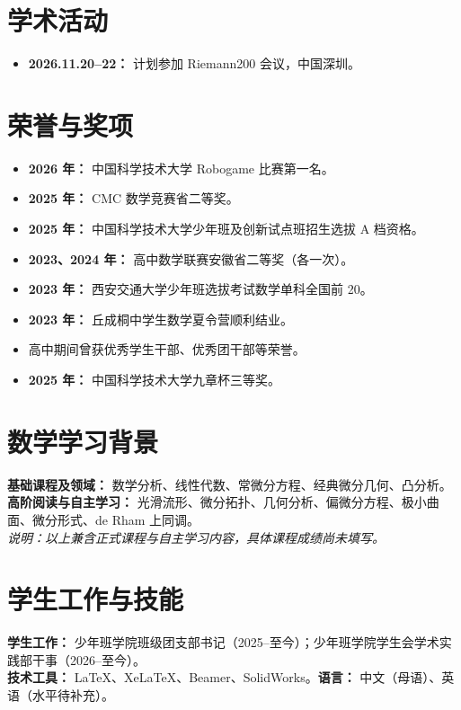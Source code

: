 \documentclass[10pt,a4paper,fontset=windows]{ctexart}
\begin{document}
\section*{学术活动}
\begin{itemize}
\item \textbf{2026.11.20--22：} 计划参加 Riemann200 会议，中国深圳。
\end{itemize}
\section*{荣誉与奖项}
\begin{itemize}
\item \textbf{2026 年：} 中国科学技术大学 Robogame 比赛第一名。
\item \textbf{2025 年：} CMC 数学竞赛省二等奖。
\item \textbf{2025 年：} 中国科学技术大学少年班及创新试点班招生选拔 A 档资格。
\item \textbf{2023、2024 年：} 高中数学联赛安徽省二等奖（各一次）。
\item \textbf{2023 年：} 西安交通大学少年班选拔考试数学单科全国前 20。
\item \textbf{2023 年：} 丘成桐中学生数学夏令营顺利结业。
\item 高中期间曾获优秀学生干部、优秀团干部等荣誉。
\item \textbf{2025 年：} 中国科学技术大学九章杯三等奖。
\end{itemize}
\section*{数学学习背景}
\textbf{基础课程及领域：} 数学分析、线性代数、常微分方程、经典微分几何、凸分析。\\
\textbf{高阶阅读与自主学习：} 光滑流形、微分拓扑、几何分析、偏微分方程、极小曲面、微分形式、de Rham 上同调。\\
\emph{说明：以上兼含正式课程与自主学习内容，具体课程成绩尚未填写。}
\section*{学生工作与技能}
\textbf{学生工作：} 少年班学院班级团支部书记（2025--至今）；少年班学院学生会学术实践部干事（2026--至今）。\\
\textbf{技术工具：} LaTeX、XeLaTeX、Beamer、SolidWorks。\quad\textbf{语言：} 中文（母语）、英语（水平待补充）。
\end{document}
